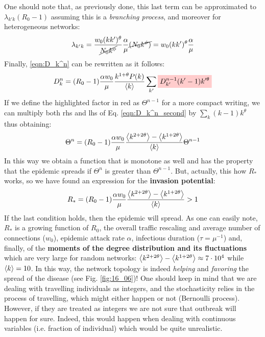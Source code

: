 \documentclass[../main/main.tex]{subfiles}
\begin{document}
One should note that, as previously done, this last term can be approximated to $\lambda_{k' k}(R_0 - 1 )$ assuming this is a \textit{branching process}, and moreover for heterogeneous networks:
\begin{equation*}
    \lambda_{k' k} = \frac{w_0 (k k')^\theta}{ \cancel{ N_0 k^\phi}} \frac{\alpha}{\mu} \cancel{ (N_0 k^\phi) }
    = w_0 (kk')^\theta \frac{\alpha}{\mu}
\end{equation*}
Finally, \ref{eqn:D_k^n} can be rewritten as it follows:
\begin{equation}
     D_k^n = (R_0 - 1)
     \frac{\alpha w_0}{\mu}
     \frac{k^{1+\theta}P(k)}{\expval{k}} \sum_{k'}
      \mathcolorbox{red!20}{D_{k'}^{n-1} (k'-1) k'^{\theta }}
    \label{eqn:D_k^n_second}
\end{equation}
If we define the highlighted factor in red as $\Theta^{n-1}$ for a more compact writing, we can multiply both rhs and lhs of Eq. \ref{eqn:D_k^n_second} by $\sum_k (k-1)k^\theta$ thus obtaining:
\begin{equation}
    \Theta^n = (R_0 - 1) \frac{\alpha w_0}{\mu} \frac{\expval{k^{2+2\theta}}- \expval{k^{1+2\theta}}}{\expval{k}} \Theta^{n-1}
\end{equation}
In this way we obtain a function that is monotone as well and has the property that the epidemic spreads if $\Theta^n$ is greater than $\Theta^{n-1}$. But, actually, this how $R_*$ works, so we have found an expression for the \textbf{invasion potential}:
\begin{equation}
    R_* = (R_0 - 1) \frac{\alpha w_0}{\mu} \frac{\expval{k^{2+2\theta}}- \expval{k^{1+2\theta}}}{\expval{k}} > 1
    \label{eqn:R_*_def}
\end{equation}
If the last condition holds, then the epidemic will spread. As one can easily note, $R_*$ is a growing function of $R_0$, the overall traffic rescaling and average number of connections ($w_0$), epidemic attack rate $\alpha$, infectious duration ($\tau = \mu^{-1}$) and, finally, of the \textbf{moments of the degree distribution and its fluctuations} which are very large for random networks: $\expval{k^{2+2\theta}}- \expval{k^{1+2\theta}} \approx 7\cdot 10^4$ while $\expval{k}= 10$. In this way, the network topology is indeed \textit{helping} and \textit{favoring}
 the spread of the disease (see Fig. \ref{fig:16_06})!
One should keep in mind that we are dealing with travelling individuals as integers, and the stochasticity relies in the process of travelling, which might either happen or not (Bernoulli process). However, if they are treated as integers we are not sure that outbreak will happen for sure. Indeed, this would happen when dealing with continuous variables (i.e. fraction of individual) which would be quite unrealistic.
\end{document}
